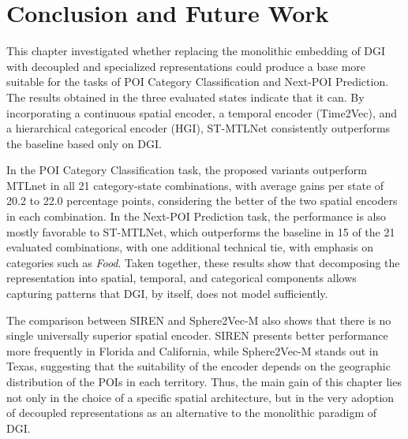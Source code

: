 \section{Conclusion and Future Work}
\label{sec:courb:conclusion}

This chapter investigated whether replacing the monolithic embedding of DGI with decoupled and specialized representations could produce a base more suitable for the tasks of POI Category Classification and Next-POI Prediction. The results obtained in the three evaluated states indicate that it can. By incorporating a continuous spatial encoder, a temporal encoder (Time2Vec), and a hierarchical categorical encoder (HGI), ST-MTLNet consistently outperforms the baseline based only on DGI.

In the POI Category Classification task, the proposed variants outperform MTLnet in all 21 category-state combinations, with average gains per state of 20.2 to 22.0 percentage points, considering the better of the two spatial encoders in each combination. In the Next-POI Prediction task, the performance is also mostly favorable to ST-MTLNet, which outperforms the baseline in 15 of the 21 evaluated combinations, with one additional technical tie, with emphasis on categories such as \textit{Food}. Taken together, these results show that decomposing the representation into spatial, temporal, and categorical components allows capturing patterns that DGI, by itself, does not model sufficiently.

The comparison between SIREN and Sphere2Vec-M also shows that there is no single universally superior spatial encoder. SIREN presents better performance more frequently in Florida and California, while Sphere2Vec-M stands out in Texas, suggesting that the suitability of the encoder depends on the geographic distribution of the POIs in each territory. Thus, the main gain of this chapter lies not only in the choice of a specific spatial architecture, but in the very adoption of decoupled representations as an alternative to the monolithic paradigm of DGI.

